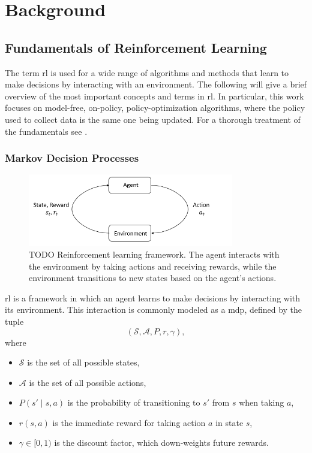 \chapter{Background}
\section{Fundamentals of Reinforcement Learning}
The term \gls{rl} is used for a wide range of algorithms and methods that learn to make decisions by interacting with an environment. The following will give a brief overview of the most important concepts and terms in \gls{rl}. In particular, this work focuses on model-free, on-policy, policy-optimization algorithms, where the policy used to collect data is the same one being updated. For a thorough treatment of the fundamentals see \cite{SuttonBarto2018}.
\subsection{Markov Decision Processes}
\begin{figure}
\centering
\includegraphics[width=0.8\textwidth]{images/rl_diagram.png}
\caption{TODO   Reinforcement learning framework. The agent interacts with the environment by taking actions and receiving rewards, while the environment transitions to new states based on the agent's actions.}
\label{fig:rl_diagram}
\end{figure}

\gls{rl} is a framework in which an agent learns to make decisions by interacting with its environment.  This interaction is commonly modeled as a \gls{mdp}, defined by the tuple
\[
(\mathcal{S}, \mathcal{A}, P, r, \gamma),
\]
where
\begin{itemize}
  \item \(\mathcal{S}\) is the set of all possible states,
  \item \(\mathcal{A}\) is the set of all possible actions,
  \item \(P(s'\!\mid\!s,a)\) is the probability of transitioning to \(s'\) from \(s\) when taking \(a\),
  \item \(r(s,a)\) is the immediate reward for taking action \(a\) in state \(s\),
  \item \(\gamma\in[0,1)\) is the discount factor, which down‐weights future rewards.
\end{itemize}

